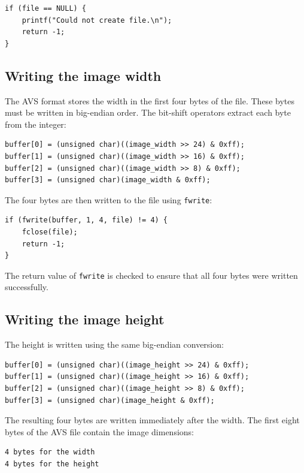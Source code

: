 \documentclass{article}
\begin{document}
\begin{lstlisting}
if (file == NULL) {
    printf("Could not create file.\n");
    return -1;
}
\end{lstlisting}

\subsection{Writing the image width}

The AVS format stores the width in the first four bytes of the file. These bytes
must be written in big-endian order. The bit-shift operators extract each byte
from the integer:

\begin{lstlisting}
buffer[0] = (unsigned char)((image_width >> 24) & 0xff);
buffer[1] = (unsigned char)((image_width >> 16) & 0xff);
buffer[2] = (unsigned char)((image_width >> 8) & 0xff);
buffer[3] = (unsigned char)(image_width & 0xff);
\end{lstlisting}

The four bytes are then written to the file using \texttt{fwrite}:

\begin{lstlisting}
if (fwrite(buffer, 1, 4, file) != 4) {
    fclose(file);
    return -1;
}
\end{lstlisting}

The return value of \texttt{fwrite} is checked to ensure that all four bytes
were written successfully.

\subsection{Writing the image height}

The height is written using the same big-endian conversion:

\begin{lstlisting}
buffer[0] = (unsigned char)((image_height >> 24) & 0xff);
buffer[1] = (unsigned char)((image_height >> 16) & 0xff);
buffer[2] = (unsigned char)((image_height >> 8) & 0xff);
buffer[3] = (unsigned char)(image_height & 0xff);
\end{lstlisting}

The resulting four bytes are written immediately after the width.
The first eight bytes of the AVS file contain the image dimensions:

\begin{verbatim}
4 bytes for the width
4 bytes for the height
\end{verbatim}
\end{document}
